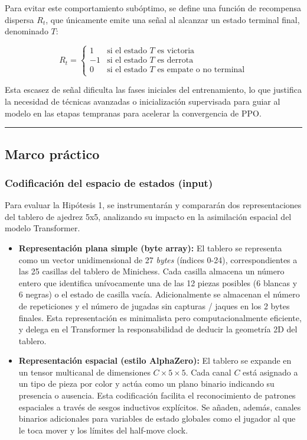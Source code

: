 \documentclass[12pt, a4paper]{article}
\begin{document}
Para evitar este comportamiento subóptimo, se define una función de recompensa dispersa $R_t$, que únicamente emite una señal al alcanzar un estado terminal final, denominado $T$:

\[
R_t = 
\begin{cases} 
1 & \text{si el estado } T \text{ es victoria} \\
-1 & \text{si el estado } T \text{ es derrota} \\
0 & \text{si el estado } T \text{ es empate o no terminal}
\end{cases}
\]

Esta escasez de señal dificulta las fases iniciales del entrenamiento, lo que justifica la necesidad de técnicas avanzadas o inicialización supervisada para guiar al modelo en las etapas tempranas para acelerar la convergencia de PPO.

\rule{\textwidth}{0.2pt}
\subsection{Marco práctico}\label{sec:marco_practico}

\subsubsection{Codificación del espacio de estados (input)}\label{sec:encoder_input}

Para evaluar la Hipótesis 1, se instrumentarán y compararán dos representaciones del tablero de ajedrez 5x5, analizando su impacto en la asimilación espacial del modelo Transformer.

\begin{itemize}
    \item \textbf{Representación plana simple (byte array):} El tablero se representa como un vector unidimensional de 27 \textit{bytes} (índices 0-24), correspondientes a las 25 casillas del tablero de Minichess. Cada casilla almacena un número entero que identifica unívocamente una de las 12 piezas posibles (6 blancas y 6 negras) o el estado de casilla vacía. Adicionalmente se almacenan el número de repeticiones y el número de jugadas sin capturas / jaques en los 2 bytes finales. Esta representación es minimalista pero computacionalmente eficiente, y delega en el Transformer la responsabilidad de deducir la geometría 2D del tablero.

    \item \textbf{Representación espacial (estilo AlphaZero):} El tablero se expande en un tensor multicanal de dimensiones $C \times 5 \times 5$. Cada canal $C$ está asignado a un tipo de pieza por color y actúa como un plano binario indicando su presencia o ausencia. Esta codificación facilita el reconocimiento de patrones espaciales a través de sesgos inductivos explícitos. Se añaden, además, canales binarios adicionales para variables de estado globales como el jugador al que le toca mover y los límites del half-move clock.
\end{itemize}
\end{document}
